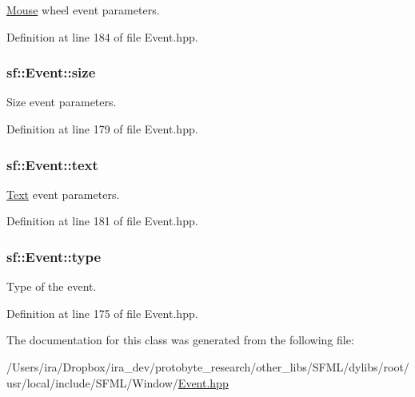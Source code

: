 \hyperlink{classsf_1_1_mouse}{Mouse} wheel event parameters. 



Definition at line 184 of file Event.\-hpp.

\hypertarget{classsf_1_1_event_a85dae56a377eeffd39183c3f6fc96cb9}{
\subsubsection[{size}]{ sf\-::\-Event\-::size}}\label{classsf_1_1_event_a85dae56a377eeffd39183c3f6fc96cb9}


Size event parameters. 



Definition at line 179 of file Event.\-hpp.

\hypertarget{classsf_1_1_event_a00c7bba6bee892791847ec22440e0a83}{
\subsubsection[{text}]{ sf\-::\-Event\-::text}}\label{classsf_1_1_event_a00c7bba6bee892791847ec22440e0a83}


\hyperlink{classsf_1_1_text}{Text} event parameters. 



Definition at line 181 of file Event.\-hpp.

\hypertarget{classsf_1_1_event_adf2f8044f713fd9d6019077b0d1ffe0a}{
\subsubsection[{type}]{ sf\-::\-Event\-::type}}\label{classsf_1_1_event_adf2f8044f713fd9d6019077b0d1ffe0a}


Type of the event. 



Definition at line 175 of file Event.\-hpp.



The documentation for this class was generated from the following file\-:\begin{DoxyCompactItemize}
\item 
/\-Users/ira/\-Dropbox/ira\-\_\-dev/protobyte\-\_\-research/other\-\_\-libs/\-S\-F\-M\-L/dylibs/root/usr/local/include/\-S\-F\-M\-L/\-Window/\hyperlink{_event_8hpp}{Event.\-hpp}\end{DoxyCompactItemize}
